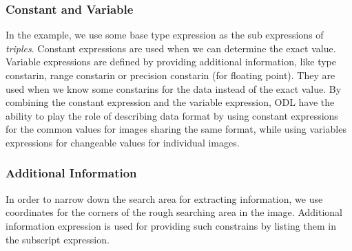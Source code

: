 \subsubsection*{Constant and Variable}
In the example, we use some base type expression as the sub expressions of  
\emph{triples}. Constant expressions are used when we can determine the exact  
value. Variable expressions are defined by providing additional information, like 
type constarin, range constarin or precision constarin (for floating point). 
They are used when we know some constarins for the data instead of the exact value. 
By combining the constant expression and the variable expression, ODL have the ability 
to play the role of describing data format by using constant expressions for 
the common values for images sharing the same format, while using variables expressions 
for changeable values for individual images. 
\subsubsection*{Additional Information}
In order to narrow down the search area for extracting information, 
we use coordinates for the corners of the rough searching area in the image. 
Additional information expression is used for providing such constrains by 
listing them in the subscript expression. 